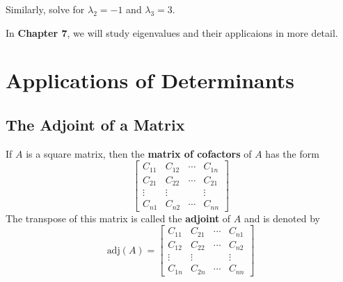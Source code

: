 \documentclass{article}
\newcommand\B{\textbf}
\begin{document}
    Similarly, solve for $\lambda_2 = -1$ and $\lambda_3 = 3$.

    In \B{Chapter 7}, we will study eigenvalues and their applicaions in more detail.

    \section{Applications of Determinants}

    \subsection{The Adjoint of a Matrix}

    If $A$ is a square matrix, then the \B{matrix of cofactors} of $A$ has the form
    \[ \begin{bmatrix}
        C_{11} & C_{12} & \cdots & C_{1n} \\
        C_{21} & C_{22 } & \cdots & C_{21}\\
        \vdots & \vdots & & \vdots \\
        C_{n1} & C_{n2} & \cdots & C_{nn}
    \end{bmatrix} \]
    The transpose of this matrix is called the \B{adjoint} of $A$ and is denoted by
    \[ \text{adj}(A) = \begin{bmatrix}
        C_{11} & C_{21}  & \cdots & C_{n1} \\
        C_{12} & C_{22} &  \cdots & C_{n2} \\
        \vdots & \vdots & & \vdots \\
        C_{1n} & C_{2n}  & \cdots & C_{nn}
    \end{bmatrix} \]
        
\end{document}
